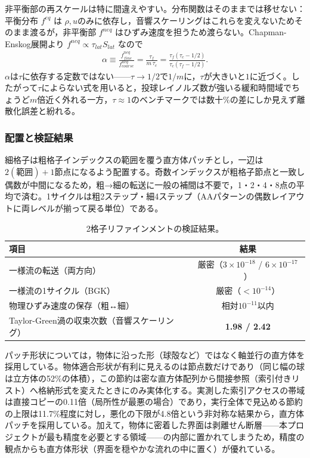 非平衡部の再スケールは特に間違えやすい。分布関数はそのままでは移せない：平衡分布 \(f^{eq}\) は \(\rho,u\)のみに依存し，音響スケーリングはこれらを変えないためそのまま渡るが，非平衡部 \(f^{neq}\) はひずみ速度を担うため渡らない。Chapman-Enskog展開より \(f^{neq}\propto\tau_{lat}S_{lat}\) なので
\begin{align}
	\alpha \equiv \frac{f^{neq}_{fine}}{f^{neq}_{coarse}}
	= \frac{\tau_f}{m\,\tau_c}
	= \frac{\tau_f(\tau_c-1/2)}{\tau_c(\tau_f-1/2)}.
	\label{eq:alpha}
\end{align}
\(\alpha\)は\(\tau\)に依存する定数ではない——\(\tau\to1/2\)で\(1/m\)に，\(\tau\)が大きいと\(1\)に近づく。したがって\(\tau\)によらない式を用いると，投球レイノルズ数が強いる緩和時間域でちょうど\(m\)倍近く外れる一方，\(\tau\approx1\)のベンチマークでは数十\%の差にしか見えず離散化誤差と紛れる。

\subsubsection{配置と検証結果}

細格子は粗格子インデックスの範囲を覆う直方体パッチとし，一辺は\(2(\text{範囲})+1\)節点になるよう配置する。奇数インデックスが粗格子節点と一致し偶数が中間になるため，粗→細の転送に一般の補間は不要で，1・2・4・8点の平均で済む。1サイクルは粗2ステップ・細4ステップ（AAパターンの偶数レイアウトに両レベルが揃って戻る単位）である。

\begin{table}[H]
	\centering
	\caption{2格子リファインメントの検証結果。}
	\label{tab:refine-validation}
	\begin{tabular}{lc}
		\Hline{1.5pt}
		項目 & 結果 \\
		\hline
		一様流の転送（両方向） & 厳密（\(3\times10^{-18}\) / \(6\times10^{-17}\)） \\
		一様流の1サイクル（BGK） & 厳密（\(<10^{-14}\)） \\
		物理ひずみ速度の保存（粗↔細） & 相対\(10^{-11}\)以内 \\
		Taylor-Green渦の収束次数（音響スケーリング） & \textbf{1.98 / 2.42} \\
		\hline
	\end{tabular}
\end{table}

パッチ形状については，物体に沿った形（球殻など）ではなく軸並行の直方体を採用している。物体適合形状が有利に見えるのは節点数だけであり（同じ幅の球は立方体の52\%の体積），この節約は密な直方体配列から間接参照（索引付きリスト）へ格納形式を変えたときにのみ実体化する。実測した索引アクセスの帯域は直接コピーの0.11倍（局所性が最悪の場合）であり，実行全体で見込める節約の上限は11.7\%程度に対し，悪化の下限が4.8倍という非対称な結果から，直方体パッチを採用している。加えて，物体に密着した界面は剥離せん断層——本プロジェクトが最も精度を必要とする領域——の内部に置かれてしまうため，精度の観点からも直方体形状（界面を穏やかな流れの中に置く）が優れている。

